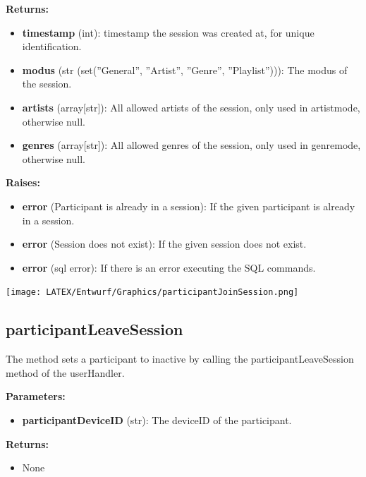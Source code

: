 \documentclass[oneside, ngerman]{sdqtechreport}
\begin{document}
\textbf{Returns:}

\begin{itemize}
    \item \textbf{timestamp} (int): timestamp the session was created at, for unique identification.
    \item \textbf{modus} (str (set(''General'', ''Artist'', ''Genre'', ''Playlist''))): The modus of the session.
    \item \textbf{artists} (array[str]): All allowed artists of the session, only used in artistmode, otherwise null.
    \item \textbf{genres} (array[str]): All allowed genres of the session, only used in genremode, otherwise null.
\end{itemize}

\textbf{Raises:}

\begin{itemize}
    \item \textbf{error} (Participant is already in a session): If the given participant is already in a session.
    \item \textbf{error} (Session does not exist): If the given session does not exist.
    \item \textbf{error} (sql error): If there is an error executing the SQL commands.
\end{itemize}

\begin{center}
   \texttt{[image: LATEX/Entwurf/Graphics/participantJoinSession.png]} 
\end{center}



\subsection*{participantLeaveSession}

The method sets a participant to inactive by calling the participantLeaveSession method of the userHandler.

\textbf{Parameters:}

\begin{itemize}
    \item \textbf{participantDeviceID} (str): The deviceID of the participant.
\end{itemize}

\textbf{Returns:}

\begin{itemize}
    \item None
\end{itemize}
\end{document}
